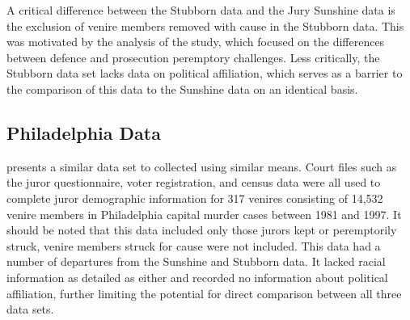 A critical difference between the Stubborn data and the Jury Sunshine data is the exclusion of venire members removed with cause in the Stubborn data. This was motivated by the analysis of the study, which focused on the differences between defence and prosecution peremptory challenges. Less critically, the Stubborn data set lacks data on political affiliation, which serves as a barrier to the comparison of this data to the Sunshine data on an identical basis.

\subsection{Philadelphia Data} \label{sec:phillydata}

\cite{PerempChalMurder} presents a similar data set to \cite{StubbornLegacy} collected using similar means. Court files such as
the juror questionnaire, voter registration, and census data were all used to complete juror demographic information for 317
venires consisting of 14,532 venire members in Philadelphia capital murder cases between 1981 and 1997. It should be noted that this data included only those
jurors kept or peremptorily struck, venire members struck for cause were not included. This data had a number of departures from the Sunshine and Stubborn data. It lacked racial information as detailed as either and recorded no information about political affiliation, further limiting the potential for direct comparison between all three data sets.